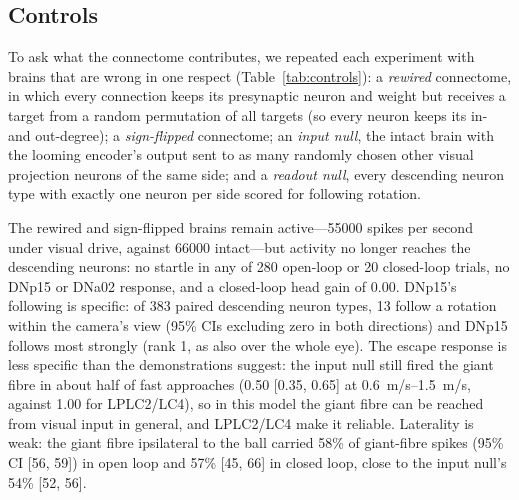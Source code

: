 \documentclass[10pt,a4paper]{article}
\begin{document}
\subsection{Controls}

To ask what the connectome contributes, we repeated each experiment with brains that are wrong in one
respect (Table~\ref{tab:controls}): a \emph{rewired} connectome, in which every connection keeps its
presynaptic neuron and weight but receives a target from a random permutation of all targets (so every
neuron keeps its in- and out-degree); a \emph{sign-flipped} connectome; an \emph{input null}, the intact
brain with the looming encoder's output sent to as many randomly chosen other visual projection neurons of
the same side; and a \emph{readout null}, every descending neuron type with exactly one neuron per side
scored for following rotation.

The rewired and sign-flipped brains remain active---\num{55000} spikes per second under visual drive,
against \num{66000} intact---but activity no longer reaches the descending neurons: no startle in any of
280 open-loop or 20 closed-loop trials, no DNp15 or DNa02 response, and a closed-loop head gain of 0.00.
DNp15's following is specific: of 383 paired descending neuron types, 13 follow a rotation within the
camera's view (95\% CIs excluding zero in both directions) and DNp15 follows most strongly (rank 1, as also
over the whole eye). The escape response is less specific than the demonstrations suggest: the input null
still fired the giant fibre in about half of fast approaches (0.50 [0.35, 0.65] at \SIrange{0.6}{1.5}{m/s},
against 1.00 for LPLC2/LC4), so in this model the giant fibre can be reached from visual input in general,
and LPLC2/LC4 make it reliable. Laterality is weak: the giant fibre ipsilateral to the ball carried 58\% of
giant-fibre spikes (95\% CI [56, 59]) in open loop and 57\% [45, 66] in closed loop, close to the input
null's 54\% [52, 56].
\end{document}
